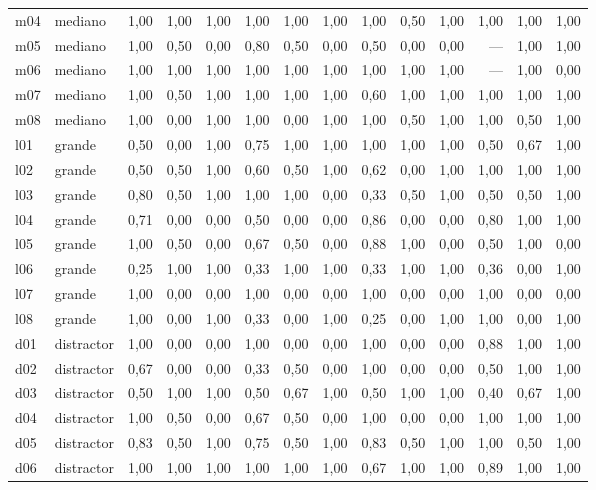 \begin{footnotesize}
\begin{longtable}{@{}l l rrr rrr rrr rrr@{}}
m04 & mediano & 1,00 & 1,00 & 1,00 & 1,00 & 1,00 & 1,00 & 1,00 & 0,50 & 1,00 & 1,00 & 1,00 & 1,00 \\
m05 & mediano & 1,00 & 0,50 & 0,00 & 0,80 & 0,50 & 0,00 & 0,50 & 0,00 & 0,00 & --- & 1,00 & 1,00 \\
m06 & mediano & 1,00 & 1,00 & 1,00 & 1,00 & 1,00 & 1,00 & 1,00 & 1,00 & 1,00 & --- & 1,00 & 0,00 \\
m07 & mediano & 1,00 & 0,50 & 1,00 & 1,00 & 1,00 & 1,00 & 0,60 & 1,00 & 1,00 & 1,00 & 1,00 & 1,00 \\
m08 & mediano & 1,00 & 0,00 & 1,00 & 1,00 & 0,00 & 1,00 & 1,00 & 0,50 & 1,00 & 1,00 & 0,50 & 1,00 \\
l01 & grande & 0,50 & 0,00 & 1,00 & 0,75 & 1,00 & 1,00 & 1,00 & 1,00 & 1,00 & 0,50 & 0,67 & 1,00 \\
l02 & grande & 0,50 & 0,50 & 1,00 & 0,60 & 0,50 & 1,00 & 0,62 & 0,00 & 1,00 & 1,00 & 1,00 & 1,00 \\
l03 & grande & 0,80 & 0,50 & 1,00 & 1,00 & 1,00 & 0,00 & 0,33 & 0,50 & 1,00 & 0,50 & 0,50 & 1,00 \\
l04 & grande & 0,71 & 0,00 & 0,00 & 0,50 & 0,00 & 0,00 & 0,86 & 0,00 & 0,00 & 0,80 & 1,00 & 1,00 \\
l05 & grande & 1,00 & 0,50 & 0,00 & 0,67 & 0,50 & 0,00 & 0,88 & 1,00 & 0,00 & 0,50 & 1,00 & 0,00 \\
l06 & grande & 0,25 & 1,00 & 1,00 & 0,33 & 1,00 & 1,00 & 0,33 & 1,00 & 1,00 & 0,36 & 0,00 & 1,00 \\
l07 & grande & 1,00 & 0,00 & 0,00 & 1,00 & 0,00 & 0,00 & 1,00 & 0,00 & 0,00 & 1,00 & 0,00 & 0,00 \\
l08 & grande & 1,00 & 0,00 & 1,00 & 0,33 & 0,00 & 1,00 & 0,25 & 0,00 & 1,00 & 1,00 & 0,00 & 1,00 \\
d01 & distractor & 1,00 & 0,00 & 0,00 & 1,00 & 0,00 & 0,00 & 1,00 & 0,00 & 0,00 & 0,88 & 1,00 & 1,00 \\
d02 & distractor & 0,67 & 0,00 & 0,00 & 0,33 & 0,50 & 0,00 & 1,00 & 0,00 & 0,00 & 0,50 & 1,00 & 1,00 \\
d03 & distractor & 0,50 & 1,00 & 1,00 & 0,50 & 0,67 & 1,00 & 0,50 & 1,00 & 1,00 & 0,40 & 0,67 & 1,00 \\
d04 & distractor & 1,00 & 0,50 & 0,00 & 0,67 & 0,50 & 0,00 & 1,00 & 0,00 & 0,00 & 1,00 & 1,00 & 1,00 \\
d05 & distractor & 0,83 & 0,50 & 1,00 & 0,75 & 0,50 & 1,00 & 0,83 & 0,50 & 1,00 & 1,00 & 0,50 & 1,00 \\
d06 & distractor & 1,00 & 1,00 & 1,00 & 1,00 & 1,00 & 1,00 & 0,67 & 1,00 & 1,00 & 0,89 & 1,00 & 1,00 \\

\end{longtable}
\end{footnotesize}
